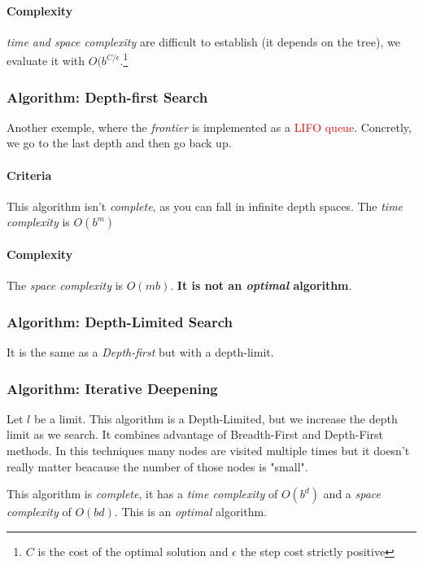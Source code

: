 \paragraph{Complexity}
\textit{time and space complexity} are difficult to establish (it depends on the tree), we evaluate it with $O(b^{C/\epsilon}$.\footnote{$C$ is the cost of the optimal solution and $\epsilon$ the step cost strictly positive}

\subsubsection{Algorithm: Depth-first Search}

Another exemple, where the \textit{frontier} is implemented as a \textcolor{red}{LIFO queue}. Concretly, we go to the last depth and then go back up.

\paragraph{Criteria}
This algorithm isn't \textit{complete}, as you can fall in infinite depth spaces. The \textit{time complexity} is $O(b^m)$ 

\paragraph{Complexity}
The \textit{space complexity} is $O(mb)$. \textbf{It is not an \textit{optimal} algorithm}.

\subsubsection{Algorithm: Depth-Limited Search}

It is the same as a \textit{Depth-first} but with a depth-limit. 

\subsubsection{Algorithm: Iterative Deepening}

Let $l$ be a limit. This algorithm is a Depth-Limited, but we increase the depth limit as we search. It combines advantage of Breadth-First and Depth-First methods. In this techniques many nodes are visited multiple times but it doesn't really matter beacause the number of those nodes is "small".

This algorithm is \textit{complete}, it has a \textit{time complexity} of $O(b^d)$ and a \textit{space complexity} of $O(bd)$. This is an \textit{optimal} algorithm.

